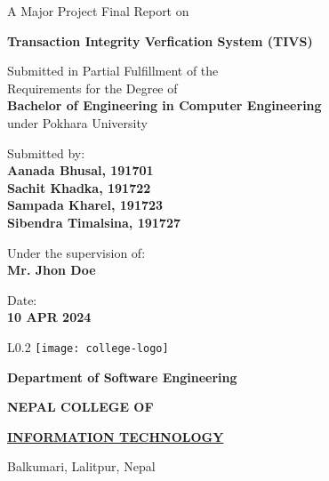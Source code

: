 \documentclass[12pt, a4paper]{report}
\begin{document}
\begin{titlepage}
	\begin{center}
	
	\large%
	A Major Project Final Report on 
	
	\huge %
	\textbf{Transaction Integrity Verfication System (TIVS)}

	\vfill
	
	\large %
	Submitted in Partial Fulfillment of the \\ 
	Requirements for the Degree of \\ 
	\textbf {Bachelor of Engineering in Computer Engineering} \\
	under Pokhara University
	
	\vfill
	
	Submitted by: \\ 
	\textbf {Aanada Bhusal, 191701} \\
	\textbf {Sachit Khadka, 191722} \\
	\textbf {Sampada Kharel, 191723} \\
	\textbf {Sibendra Timalsina, 191727} \\
	
	
	\vfill
	
	Under the supervision of: \\
	\textbf {Mr. Jhon Doe}
	
	\vfill
	
	Date: \\
	\textbf {10 APR 2024}
	
	\vfill
	
	\end{center}

	\begin{wrapfigure}{L}{0.2\textwidth}
		\centering
		\texttt{[image: college-logo]}
	\end{wrapfigure}

	\selectfont

	\textbf {Department of Software Engineering}

	\Large %
	\textbf {NEPAL COLLEGE OF}

	\LARGE %
	\textbf {\underline {INFORMATION TECHNOLOGY} }

	\small %
	Balkumari, Lalitpur, Nepal


\end{titlepage}
\end{document}
